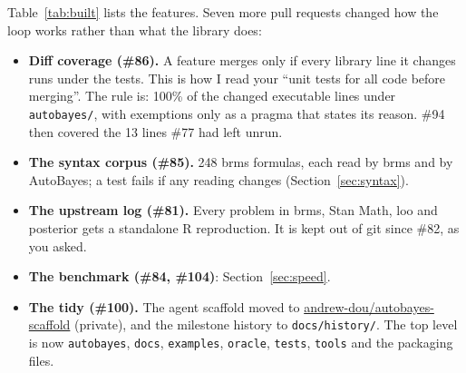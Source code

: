 \documentclass[11pt]{article}
\newcommand{\file}[1]{\texttt{#1}}
\begin{document}
\noindent Table~\ref{tab:built} lists the features. Seven more pull requests changed how the loop works rather than what the
library does:
\begin{itemize}
\item \textbf{Diff coverage (\#86).} A feature merges only if every library line it changes runs under the tests. This is
  how I read your ``unit tests for all code before merging''. The rule is: 100\% of the changed executable lines under
  \file{autobayes/}, with exemptions only as a pragma that states its reason. \#94 then covered the 13 lines \#77 had left
  unrun.
\item \textbf{The syntax corpus (\#85).} 248 brms formulas, each read by brms and by AutoBayes; a test fails if any reading
  changes (Section~\ref{sec:syntax}).
\item \textbf{The upstream log (\#81).} Every problem in brms, Stan Math, loo and posterior gets a standalone R
  reproduction. It is kept out of git since \#82, as you asked.
\item \textbf{The benchmark (\#84, \#104)}: Section~\ref{sec:speed}.
\item \textbf{The tidy (\#100).} The agent scaffold moved to \href{https://github.com/andrew-dou/autobayes-scaffold}{andrew-dou/autobayes-scaffold}
  (private), and the milestone history to \file{docs/history/}. The top level is now \file{autobayes}, \file{docs},
  \file{examples}, \file{oracle}, \file{tests}, \file{tools} and the packaging files.
\end{itemize}
\end{document}
